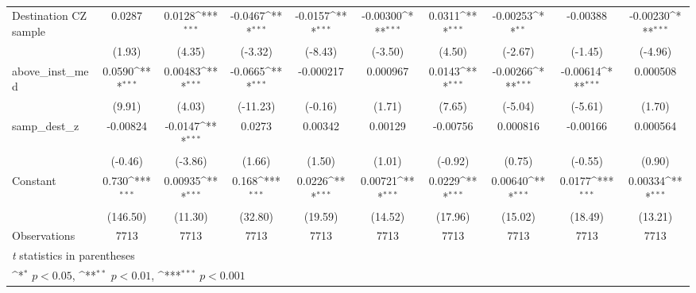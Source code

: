 \begin{table}[htbp]\centering
\def\sym#1{\ifmmode^{#1}\else\(^{#1}\)\fi}
\caption{ \label{tab1}}
\begin{tabular}{l*{9}{c}}
\toprule
\midrule
Destination CZ sample&      0.0287         &      0.0128\sym{***}&     -0.0467\sym{***}&     -0.0157\sym{***}&    -0.00300\sym{***}&      0.0311\sym{***}&    -0.00253\sym{**} &    -0.00388         &    -0.00230\sym{***}\\
                    &      (1.93)         &      (4.35)         &     (-3.32)         &     (-8.43)         &     (-3.50)         &      (4.50)         &     (-2.67)         &     (-1.45)         &     (-4.96)         \\
\addlinespace
above\_inst\_med      &      0.0590\sym{***}&     0.00483\sym{***}&     -0.0665\sym{***}&   -0.000217         &    0.000967         &      0.0143\sym{***}&    -0.00266\sym{***}&    -0.00614\sym{***}&    0.000508         \\
                    &      (9.91)         &      (4.03)         &    (-11.23)         &     (-0.16)         &      (1.71)         &      (7.65)         &     (-5.04)         &     (-5.61)         &      (1.70)         \\
\addlinespace
samp\_dest\_z         &    -0.00824         &     -0.0147\sym{***}&      0.0273         &     0.00342         &     0.00129         &    -0.00756         &    0.000816         &    -0.00166         &    0.000564         \\
                    &     (-0.46)         &     (-3.86)         &      (1.66)         &      (1.50)         &      (1.01)         &     (-0.92)         &      (0.75)         &     (-0.55)         &      (0.90)         \\
\addlinespace
Constant            &       0.730\sym{***}&     0.00935\sym{***}&       0.168\sym{***}&      0.0226\sym{***}&     0.00721\sym{***}&      0.0229\sym{***}&     0.00640\sym{***}&      0.0177\sym{***}&     0.00334\sym{***}\\
                    &    (146.50)         &     (11.30)         &     (32.80)         &     (19.59)         &     (14.52)         &     (17.96)         &     (15.02)         &     (18.49)         &     (13.21)         \\
\midrule
Observations        &        7713         &        7713         &        7713         &        7713         &        7713         &        7713         &        7713         &        7713         &        7713         \\
\bottomrule
\multicolumn{10}{l}{\footnotesize \textit{t} statistics in parentheses}\\
\multicolumn{10}{l}{\footnotesize \sym{*} \(p<0.05\), \sym{**} \(p<0.01\), \sym{***} \(p<0.001\)}\\
\end{tabular}
\end{table}
